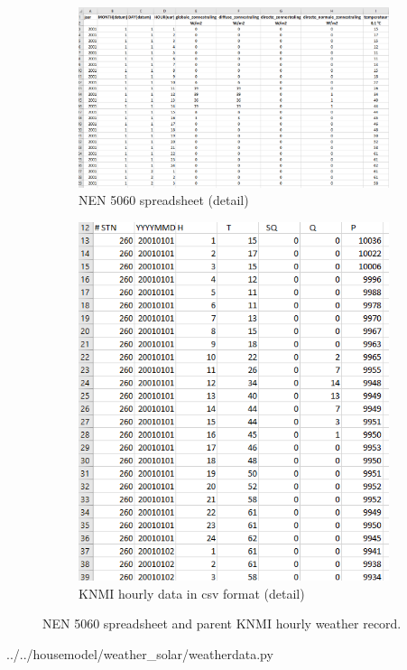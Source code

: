 \begin{figure}[H]
	\begin{subfigure}{.7\textwidth}
		\centering
		\includegraphics[width=.8\linewidth]{Figures/NEN5060.png}  
		\caption{NEN 5060 spreadsheet (detail)}
		\label{fig:nen5060}
	\end{subfigure}
	\begin{subfigure}{.3\textwidth}
		\centering
		\includegraphics[width=.8\linewidth]{Figures/KNMI.png}  
		\caption{KNMI hourly data in csv format (detail)}
		\label{fig:knmi}
	\end{subfigure}
	\caption{NEN 5060 spreadsheet and parent KNMI hourly weather record.}
	\label{fig:fig}
\end{figure}


 
{../../housemodel/weather_solar/weatherdata.py}

